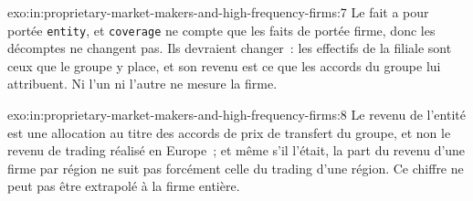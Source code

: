 \begin{solution}{exo:in:proprietary-market-makers-and-high-frequency-firms:7}
Le fait a pour portée \texttt{entity}, et \texttt{coverage} ne compte que les faits de portée firme, donc les décomptes ne changent pas. Ils devraient
changer~: les effectifs de la filiale sont ceux que le groupe y place, et son revenu est ce que les accords du groupe lui attribuent.
Ni l'un ni l'autre ne mesure la firme.
\end{solution}

\begin{solution}{exo:in:proprietary-market-makers-and-high-frequency-firms:8}
Le revenu de l'entité est une allocation au titre des accords de prix de transfert du groupe, et non le revenu de trading réalisé en
Europe~; et même s'il l'était, la part du revenu d'une firme par région ne suit pas forcément celle du trading d'une région. Ce
chiffre ne peut pas être extrapolé à la firme entière.
\end{solution}

